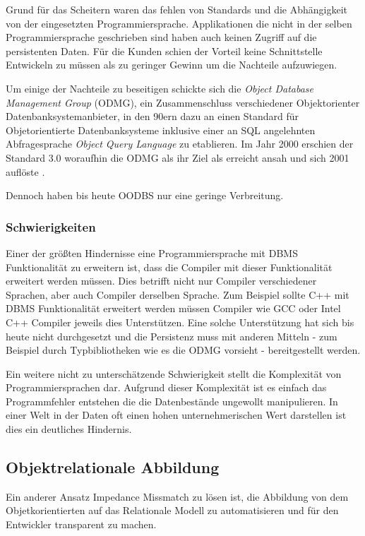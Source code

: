 
Grund für das Scheitern waren das fehlen von Standards und die Abhängigkeit von der eingesetzten Programmiersprache. Applikationen die nicht in der selben Programmiersprache geschrieben sind haben auch keinen Zugriff auf die persistenten Daten. Für die Kunden schien der Vorteil keine Schnittstelle Entwickeln zu müssen als zu geringer Gewinn \cite{stonebraker} um die Nachteile aufzuwiegen.

Um einige der Nachteile zu beseitigen schickte sich die \emph{Object Database Management Group} (ODMG), ein Zusammenschluss verschiedener Objektorienter Datenbanksystemanbieter, in den 90ern dazu an einen Standard für Objetorientierte Datenbanksysteme inklusive einer an SQL angelehnten Abfragesprache \emph{Object Query Language} zu etablieren. Im Jahr 2000 erschien der Standard 3.0 woraufhin die ODMG als ihr Ziel als erreicht ansah und sich 2001 auflöste \cite{http://www.odbms.org/odmg-standard/}.

Dennoch haben bis heute OODBS nur eine geringe Verbreitung.



\subsubsection{Schwierigkeiten}
Einer der größten Hindernisse eine Programmiersprache mit DBMS Funktionalität zu erweitern ist, dass die Compiler mit dieser Funktionalität erweitert werden müssen. Dies betrifft nicht nur Compiler verschiedener Sprachen, aber auch Compiler derselben Sprache. Zum Beispiel sollte C++ mit DBMS Funktionalität erweitert werden müssen Compiler wie GCC oder Intel C++ Compiler jeweils dies Unterstützen. Eine solche Unterstützung hat sich bis heute nicht durchgesetzt und die Persistenz muss mit anderen Mitteln - zum Beispiel durch Typbibliotheken wie es die ODMG vorsieht - bereitgestellt werden.

Ein weitere nicht zu unterschätzende Schwierigkeit stellt die Komplexität von Programmiersprachen dar. Aufgrund dieser Komplexität ist es einfach das Programmfehler entstehen die die Datenbestände ungewollt manipulieren. In einer Welt in der Daten oft einen hohen unternehmerischen Wert darstellen ist dies ein deutliches Hindernis. 


\subsection{Objektrelationale Abbildung}
Ein anderer Ansatz Impedance Missmatch zu lösen ist, die Abbildung von dem Objetkorientierten auf das Relationale Modell zu automatisieren und für den Entwickler transparent zu machen.

